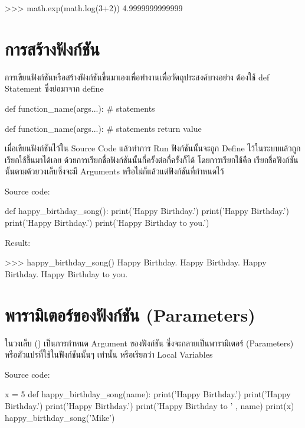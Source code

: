 \begin{codelist}{}{}
>>> math.exp(math.log(3+2))
4.9999999999999
\end{codelist}

\section{การสร้างฟังก์ชัน}

การเขียนฟังก์ชันหรือสร้างฟังก์ชันขึ้นมาเองเพื่อทำงานเพื่อวัตถุประสงค์บางอย่าง ต้องใช้ def Statement ซึ่งย่อมาจาก define 

\begin{codelist}{}{}
def function_name(args...):
    # statements

def function_name(args...):
    # statements
    return value
\end{codelist}

เมื่อเขียนฟังก์ชันไว้ใน Source Code แล้วทำการ Run ฟังก์ชันนั้นจะถูก Define ไว้ในระบบแล้วถูกเรียกใช้ขึ้นมาได้เลย ด้วยการเรียกชื่อฟังก์ชันนั้นกี่ครั้งต่อกี่ครั้งก็ได้ โดยการเรียกใช้คือ เรียกชื่อฟังก์ชันนั้นตามด้วยวงเล็บซึ่งจะมี Arguments หรือไม่ก็แล้วแต่ฟังก์ชันที่กำหนดไว้

Source code:
\begin{codelist}{}{}
def happy_birthday_song():
    print('Happy Birthday.')
    print('Happy Birthday.')
    print('Happy Birthday.')
    print('Happy Birthday to you.')
\end{codelist}

Result:
\begin{codelist}{}{}
>>>  happy_birthday_song()
Happy Birthday.
Happy Birthday.
Happy Birthday.
Happy Birthday to you.
\end{codelist}


\section{พารามิเตอร์ของฟังก์ชัน (Parameters)}

ในวงเล็บ () เป็นการกำหนด Argument ของฟังก์ชัน ซึ่งจะกลายเป็นพารามิเตอร์ (Parameters) หรือตัวแปรที่ใช้ในฟังก์ชันนั้นๆ เท่านั้น หรือเรียกว่า Local Variables 

Source code:
\begin{codelist}{}{}
x = 5
def happy_birthday_song(name):
    print('Happy Birthday.')
    print('Happy Birthday.')
    print('Happy Birthday.')
    print('Happy Birthday to ' , name)
    print(x)
happy_birthday_song('Mike')
\end{codelist}

